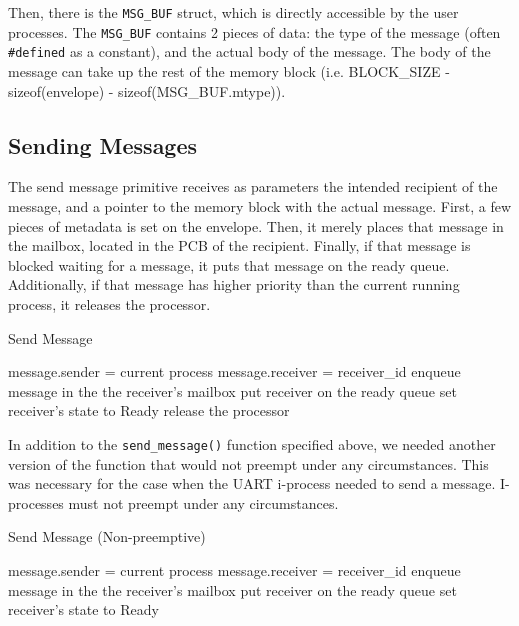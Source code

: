 \documentclass[12pt]{report}
\begin{document}
Then, there is the \texttt{MSG_BUF} struct, which is directly accessible by the user processes. The \texttt{MSG_BUF} contains 2 pieces of data: the type of the message (often \texttt{\#defined} as a constant), and the actual body of the message. The body of the message can take up the rest of the memory block (i.e. BLOCK_SIZE - sizeof(envelope) - sizeof(MSG_BUF.mtype)). 


\subsection{Sending Messages}

The send message primitive receives as parameters the intended recipient of the message, and a pointer to the memory block with the actual message. First, a few pieces of metadata is set on the envelope. Then, it merely places that message in the mailbox, located in the PCB of the recipient. Finally, if that message is blocked waiting for a message, it puts that message on the ready queue. Additionally, if that message has higher priority than the current running process, it releases the processor.

\begin{algorithm}[H]
	\caption{Send Message}
	\begin{algorithmic}[1]
			\State message.sender = current process
			\State message.receiver = receiver_id
			\State enqueue message in the the receiver's mailbox
				\State put receiver on the ready queue
				\State set receiver's state to Ready
					\State release the processor
				\EndIf
			\EndIf
		\EndFunction
	\end{algorithmic}
\end{algorithm}

In addition to the \texttt{send_message()} function specified above, we needed another version of the function that would not preempt under any circumstances. This was necessary for the case when the UART i-process needed to send a message. I-processes must not preempt under any circumstances.

\begin{algorithm}[H]
	\caption{Send Message (Non-preemptive)}
	\begin{algorithmic}[1]
			\State message.sender = current process
			\State message.receiver = receiver_id
			\State enqueue message in the the receiver's mailbox
				\State put receiver on the ready queue
				\State set receiver's state to Ready
			\EndIf
		\EndFunction
	\end{algorithmic}
\end{algorithm}
\end{document}
